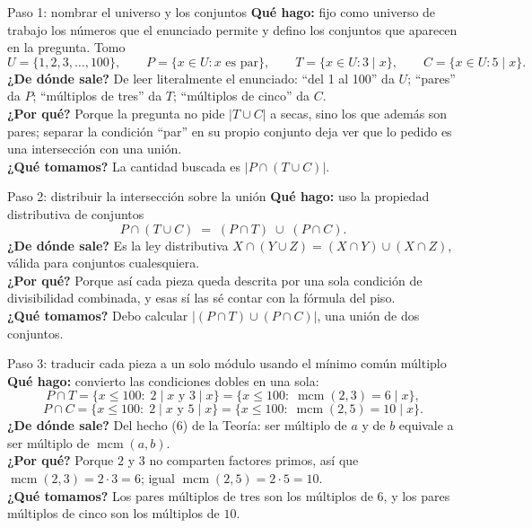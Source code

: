 \documentclass[11pt]{article}
\begin{document}
\begin{sol}

\begin{paso}{Paso 1: nombrar el universo y los conjuntos}
\textbf{Qu\'e hago:} fijo como universo de trabajo los n\'umeros que el enunciado permite y defino los conjuntos que aparecen en la pregunta. Tomo
\[
U=\{1,2,3,\dots,100\},\qquad
P=\{x\in U: x \text{ es par}\},\qquad
T=\{x\in U: 3\mid x\},\qquad
C=\{x\in U: 5\mid x\}.
\]
\textbf{¿De d\'onde sale?} De leer literalmente el enunciado: ``del 1 al 100'' da $U$; ``pares'' da $P$; ``m\'ultiplos de tres'' da $T$; ``m\'ultiplos de cinco'' da $C$.\\
\textbf{¿Por qu\'e?} Porque la pregunta no pide $|T\cup C|$ a secas, sino los que adem\'as son pares; separar la condici\'on ``par'' en su propio conjunto deja ver que lo pedido es una intersecci\'on con una uni\'on.\\
\textbf{¿Qu\'e tomamos?} La cantidad buscada es $\big|P\cap (T\cup C)\big|$.
\end{paso}

\begin{paso}{Paso 2: distribuir la intersecci\'on sobre la uni\'on}
\textbf{Qu\'e hago:} uso la propiedad distributiva de conjuntos
\[
P\cap (T\cup C) \;=\; (P\cap T)\;\cup\;(P\cap C).
\]
\textbf{¿De d\'onde sale?} Es la ley distributiva $X\cap(Y\cup Z)=(X\cap Y)\cup(X\cap Z)$, v\'alida para conjuntos cualesquiera.\\
\textbf{¿Por qu\'e?} Porque as\'i cada pieza queda descrita por una sola condici\'on de divisibilidad combinada, y esas s\'i las s\'e contar con la f\'ormula del piso.\\
\textbf{¿Qu\'e tomamos?} Debo calcular $|(P\cap T)\cup(P\cap C)|$, una uni\'on de dos conjuntos.
\end{paso}

\begin{paso}{Paso 3: traducir cada pieza a un solo m\'odulo usando el m\'inimo com\'un m\'ultiplo}
\textbf{Qu\'e hago:} convierto las condiciones dobles en una sola:
\[
P\cap T = \{x\le 100:\; 2\mid x \text{ y } 3\mid x\} = \{x\le 100:\; \operatorname{mcm}(2,3)=6 \mid x\},
\]
\[
P\cap C = \{x\le 100:\; 2\mid x \text{ y } 5\mid x\} = \{x\le 100:\; \operatorname{mcm}(2,5)=10 \mid x\}.
\]
\textbf{¿De d\'onde sale?} Del hecho (6) de la Teor\'ia: ser m\'ultiplo de $a$ y de $b$ equivale a ser m\'ultiplo de $\operatorname{mcm}(a,b)$.\\
\textbf{¿Por qu\'e?} Porque $2$ y $3$ no comparten factores primos, as\'i que $\operatorname{mcm}(2,3)=2\cdot 3=6$; igual $\operatorname{mcm}(2,5)=2\cdot 5=10$.\\
\textbf{¿Qu\'e tomamos?} Los pares m\'ultiplos de tres son los m\'ultiplos de $6$, y los pares m\'ultiplos de cinco son los m\'ultiplos de $10$.
\end{paso}


\end{sol}
\end{document}

